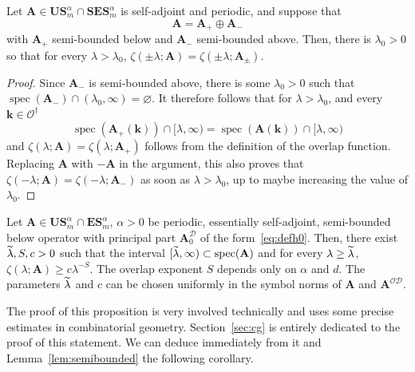 \documentclass[AHL,Unicode,longabstracts,published]{cedram}
\DeclareMathOperator{\spec}{spec}
\newcommand{\CD}{\mathcal{D}}
\newcommand{\CO}{\mathcal{O}}
\newcommand{\BA}{\mathbf A}
\newcommand{\BE}{\mathbf E}
\newcommand{\BS}{\mathbf S}
\newcommand{\BU}{\mathbf U}
\newcommand{\bk}{\mathbf k}
\let\oldtilde\tilde
\renewcommand*{\tilde}[1]{\mathchoice{\widetilde{#1}}{\widetilde{#1}}{\oldtilde{#1}}{\oldtilde{#1}}}
\begin{document}
\begin{lemm}\label{lem:semibounded}
Let $\BA \in \BU\BS^\alpha_m \cap \BS\BE\BS^\alpha_m$ is self-adjoint and periodic, and suppose that
\begin{equation}
\BA = \BA_+ \oplus \BA_-
\end{equation}
with $\BA_+$ semi-bounded below and $\BA_-$ semi-bounded above. Then, there is $\lambda_0 > 0$ so that for every $\lambda > \lambda_0$, $\zeta(\pm \lambda;\BA) = \zeta(\pm \lambda; \BA_\pm)$.
\end{lemm}

\begin{proof}
Since $\BA_-$ is semi-bounded above, there is some $\lambda_0 > 0$ such that $\spec(\BA_-) \cap (\lambda_0,\infty) =
\varnothing$. It therefore follows that for $\lambda > \lambda_0$, and every $\bk \in
\CO^\dagger$
\begin{equation}
\spec(\BA_+(\bk)) \cap [\lambda,\infty) = \spec(\BA(\bk)) \cap [\lambda,\infty)
\end{equation}
and $\zeta(\lambda;\BA) = \zeta(\lambda;\BA_+)$ follows from the definition of the overlap function. Replacing $\BA$ with $- \BA$ in the argument, this also proves that $\zeta(-\lambda;\BA) = \zeta(-\lambda;\BA_-)$ as soon as $\lambda >
\lambda_0$, up to maybe increasing the value of $\lambda_0$.
\end{proof}


\begin{prop}\label{thm:uncoupledbs}
Let $\BA \in \BU\BS^\alpha_m \cap \BE\BS_m^\alpha$, $\alpha > 0$ be periodic, essentially self-adjoint, semi-bounded below operator with principal part $\BA_0^\CD$ of the form~\eqref{eq:defh0}. Then, there exist $\tilde \lambda, S,c > 0$ such that the interval $[\tilde \lambda,\infty) \subset \spec(\BA)$ and for every $\lambda \ge \tilde \lambda$, $\zeta(\lambda;\BA) \ge c \lambda^{-S}$. The overlap exponent $S$ depends only on $\alpha$ and $d$. The parameters $\tilde \lambda$ and $c$ can be chosen uniformly in the symbol norms of $\BA$ and $\BA^{\CO\CD}$.
\end{prop}


The proof of this proposition is very involved technically and uses some precise estimates in combinatorial geometry. Section~\ref{sec:cg} is entirely dedicated to the proof of this statement. We can deduce immediately from it and Lemma~\ref{lem:semibounded} the following corollary.
\end{document}
